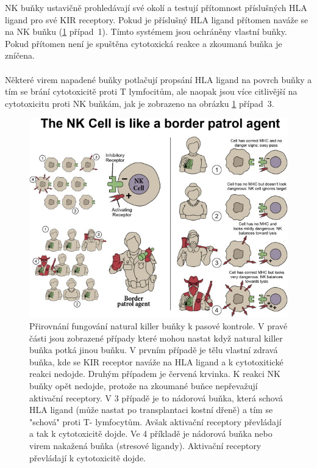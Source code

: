 \documentclass[czech,DP]{thesiskiv}
\numberwithin{equation}{section}
\begin{document}
\noindent
NK buňky ustavičně prohledávají své okolí a testují přítomnost příslušných HLA ligand pro své KIR receptory. Pokud je příslušný HLA ligand přítomen naváže se na NK buňku (\ref{fig:kir_princip} případ~1). Tímto systémem jsou ochráněny vlastní buňky. Pokud přítomen není je spuštěna cytotoxická reakce a zkoumaná buňka je zníčena.
\\
\\
Některé virem napadené buňky potlačují propsání HLA ligand na povrch buňky a tím se brání cytotoxicitě proti T lymfocitům, ale naopak jsou více citlivější na cytotoxicitu proti NK buňkám, jak je zobrazeno na obrázku \ref{fig:kir_princip} případ~3.
\begin{figure}[H]		
		\centering
		\includegraphics[width=\textwidth]{./img/NK_princip.jpg}
		\caption{Přirovnání fungování natural killer buňky k pasové kontrole. V pravé části jsou zobrazené případy které mohou nastat když natural killer buňka potká jinou buňku. V prvním případě je tělu vlastní zdravá buňka, kde se KIR receptor naváže na HLA ligand a k cytotoxitické reakci nedojde. Druhým případem je červená krvinka. K reakci NK buňky opět nedojde, protože na zkoumané buňce nepřevažují aktivační receptory. V 3 případě je to nádorová buňka, která schová HLA ligand (může nastat po transplantaci kostní dřeně) a tím se "schová" proti T- lymfocytům. Avšak aktivační receptory převládají a tak k cytotoxicitě dojde. Ve 4 příkladě je nádorová buňka nebo virem nakažená buňka (stresové ligandy). Aktivační receptory převládají k cytotoxicitě dojde.\cite{KIR_img_princip}}
		\label{fig:kir_princip}
\end{figure}
\end{document}
